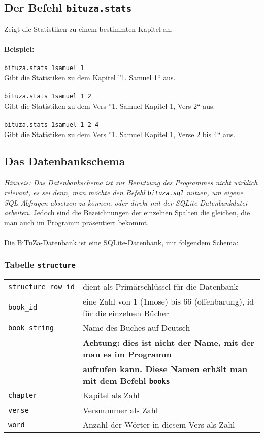 \documentclass[a4paper]{scrartcl}
\begin{document}
\subsection{Der Befehl \texttt{bituza.stats}}

Zeigt die Statistiken zu einem bestimmten Kapitel an.\\
\\
\textbf{Beispiel:}\\
\\
\texttt{bituza.stats 1samuel 1}\\
Gibt die Statistiken zu dem Kapitel ''1. Samuel 1`` aus.
\\\\
\texttt{bituza.stats 1samuel 1 2}\\
Gibt die Statistiken zu dem Vers ''1. Samuel Kapitel 1, Vers 2`` aus.
\\\\
\texttt{bituza.stats 1samuel 1 2-4}\\
Gibt die Statistiken zu dem Vers ''1. Samuel Kapitel 1, Verse 2 bis 4`` aus.

\subsection{Das Datenbankschema}

\textit{Hinweis: Das Datenbankschema ist zur Benutzung des Programmes nicht wirklich relevant, es sei denn, man möchte den Befehl \texttt{bituza.sql} nutzen, um eigene SQL-Abfragen absetzen zu können, oder direkt mit der SQLite-Datenbankdatei arbeiten.} Jedoch sind die Bezeichnungen der einzelnen Spalten die gleichen, die man auch im Programm präsentiert bekommt.\\\\
\noindent
Die BiTuZa-Datenbank ist eine SQLite-Datenbank, mit folgendem Schema:

\subsubsection{Tabelle \texttt{structure}}

\begin{tabular}{l|l}
\texttt{\underline{structure\_row\_id}}	& dient als Primärschlüssel für die Datenbank	\\
\texttt{book\_id}			& eine Zahl von 1 (1mose) bis 66 (offenbarung), id für die einzelnen Bücher	\\
\texttt{book\_string}		& Name des Buches auf Deutsch \\
							& \textbf{Achtung: dies ist nicht der Name, mit der man es im Programm}\\
							& \textbf{aufrufen kann. Diese Namen erhält man mit dem Befehl \texttt{books}}	\\
\texttt{chapter}			& Kapitel als Zahl	\\
\texttt{verse}				& Versnummer als Zahl	\\
\texttt{word}				& Anzahl der Wörter in diesem Vers als Zahl	\\
\end{tabular}
\end{document}
